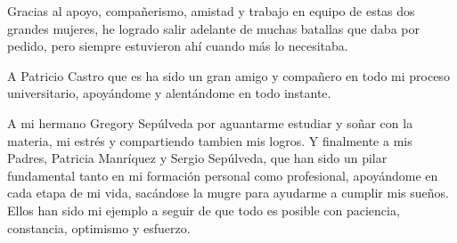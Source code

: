\begin{acknowledgment}
    Gracias al apoyo, compañerismo, amistad y trabajo en equipo de estas dos grandes mujeres, he logrado salir adelante de muchas batallas que daba por pedido, pero siempre estuvieron ahí cuando más lo necesitaba.

    A Patricio Castro que es ha sido un gran amigo y compañero en todo mi proceso universitario, apoyándome y alentándome en todo instante.     

    A mi hermano Gregory Sepúlveda por aguantarme estudiar y soñar con la materia, mi estrés y compartiendo tambien mis logros. Y finalmente a mis Padres, Patricia Manríquez y Sergio Sepúlveda, que han sido un pilar fundamental tanto en mi formación personal como profesional, apoyándome en cada etapa de mi vida, sacándose la mugre para ayudarme a cumplir mis sueños. Ellos han sido mi ejemplo a seguir de que todo es posible con paciencia, constancia, optimismo y esfuerzo. 


\end{acknowledgment}